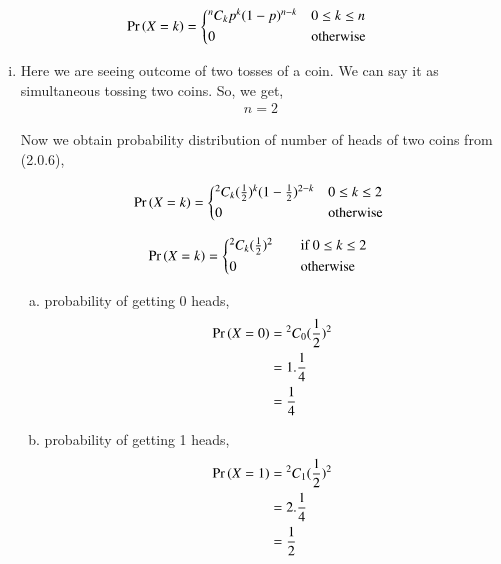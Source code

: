 \documentclass[journal,12pt,twocolumn]{IEEEtran}
\begin{document}
\begin{align}
   \pr{X=k} =
  \begin{cases*}
    {^n C_k}p^{k}(1-p)^{n-k} & $0 \leq k \leq n$\\
      0 & otherwise
  \end{cases*}
\end{align}

\begin{enumerate}[(i)]

\item
Here we are seeing outcome of two tosses of a coin. We can say it as simultaneous tossing two coins. So, we get,
\begin{align}
    n=2
\end{align}

Now we obtain probability distribution of number of heads of two coins from (2.0.6),

\begin{align*}
   \pr{X=k} =
  \begin{cases*}
    {^2 C_k}(\frac{1}{2})^{k}(1-\frac{1}{2})^{2-k} & $0 \leq k \leq 2$\\
    0 & otherwise
  \end{cases*}
\end{align*}

\begin{align}
   \pr{X=k} =
  \begin{cases*}
    {^2 C_k}(\frac{1}{2})^{2} \quad& if $0 \leq k \leq 2$ \\
    0 \quad& otherwise
  \end{cases*}
\end{align}


\begin{enumerate}[(a)]
    \item probability of getting 0 heads,
        \begin{align}
            \begin{split}
                \Pr\left(X=0\right) &= {^2C_0}(\frac{1}{2})^2\\
                &=1.\frac{1}{4}\\
                &=\frac{1}{4}
            \end{split}
        \end{align}

    \item probability of getting 1 heads,
        \begin{align}
            \begin{split}
                \Pr\left(X=1\right) &= {^2C_1}(\frac{1}{2})^2\\
                &=2.\frac{1}{4}\\
                &=\frac{1}{2}
            \end{split}
        \end{align}


\end{enumerate}
\end{enumerate}
\end{document}
